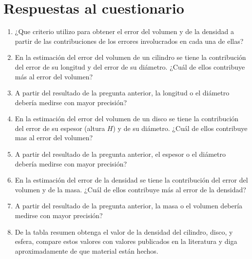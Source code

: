 \documentclass[letter,twoside,11pt]{article}
\begin{document}
\section{Respuestas al cuestionario}
\begin{enumerate}
\item ¿Que criterio utilizo para obtener el error del volumen y de la densidad
a partir de las contribuciones de los errores involucrados en cada una de ellas?
\item En la estimación del error del volumen de un cilindro se tiene la
contribución del error de su longitud y del error de su diámetro. ¿Cuál de ellos
contribuye más al error del volumen?
\item A partir del resultado de la pregunta anterior, la longitud o el diámetro
debería medirse con mayor precisión?
\item En la estimación del error del volumen de un disco se tiene la
contribución del error de su espesor (altura $H$) y de su diámetro. ¿Cuál de ellos contribuye mas al error del volumen?
\item A partir del resultado de la pregunta anterior, el espesor o el diámetro
debería medirse con mayor precisión?
\item En la estimación del error de la densidad se tiene la contribución del
error del volumen y de la masa. ¿Cuál de ellos contribuye más al error de la
densidad?
\item A partir del resultado de la pregunta anterior, la masa o el volumen
debería medirse con mayor precisión?
\item De la tabla resumen obtenga el valor de la densidad del cilindro, disco, y
esfera, compare estos valores con valores publicados en la literatura y diga
aproximadamente de que material están hechos.
\end{enumerate}
\end{document}
